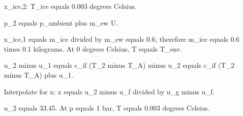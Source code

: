 x_ice,2:  
T_ice equals 0.003 degrees Celsius.  

p_2 equals p_ambient plus m_ew U.  

x_ice,1 equals m_ice divided by m_ew equals 0.6, therefore m_ice equals 0.6 times 0.1 kilograms.  
At 0 degrees Celsius, T equals T_env.  

u_2 minus u_1 equals c_if (T_2 minus T_A) minus u_2 equals c_if (T_2 minus T_A) plus u_1.  

Interpolate for x:  
x equals u_2 minus u_f divided by u_g minus u_f.  

u_2 equals 33.45.  
At p equals 1 bar, T equals 0.003 degrees Celsius.